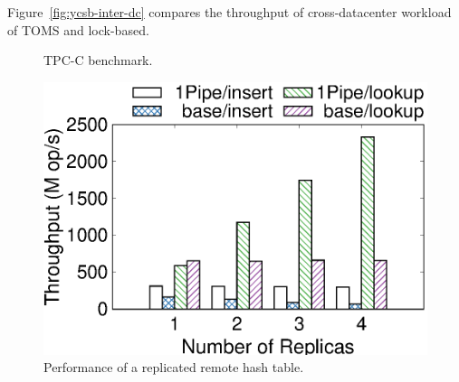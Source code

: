 Figure~\ref{fig:ycsb-inter-dc} compares the throughput of cross-datacenter workload of TOMS and lock-based.
\fi

\begin{figure}[t]
    \begin{minipage}[]{.66\textwidth}
    	\centering
    	\hspace{0.01\textwidth}
    	\vspace{-5pt}
    	\caption{TPC-C benchmark.}
    	\label{fig:tpc-c}
    \end{minipage}
    \hspace{0.01\textwidth}
    \begin{minipage}[]{.32\textwidth}
        \includegraphics[width=\textwidth]{gnuplot/remote-hashtable.eps}
        \vspace{-15pt}
    	\caption{Performance of a replicated remote hash table.}
    	\label{fig:remote-hashtable}
    	\vspace{-15pt}
    \end{minipage}
    \vspace{-15pt}
\end{figure}

